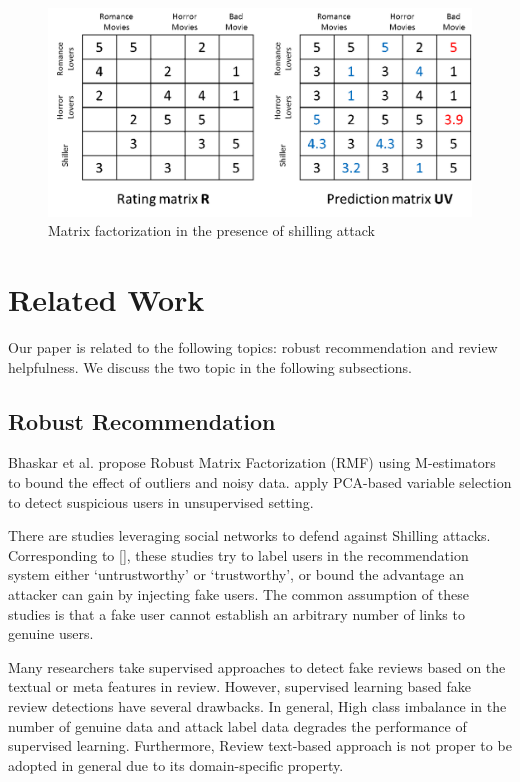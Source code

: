 \documentclass[master,english,final]{kaist-ucs}
\begin{document}
\begin{figure}[h]
    \centerline{\includegraphics[width=12.5cm]{figure/mf_attacked}}
    \caption{  Matrix factorization in the presence of shilling attack   } \label{mf_attacked}
\end{figure}

\chapter{Related Work}
Our paper is related to the following topics: robust recommendation and review helpfulness. We discuss the two topic in the following subsections.

\section{Robust Recommendation}
Bhaskar et al. \cite{RMF} propose Robust Matrix Factorization (RMF) using M-estimators to bound the effect of outliers and noisy data. \cite{LiesAndPropaganda,UnsupervisedShilling,AttackResistant} apply PCA-based variable selection to detect suspicious users in unsupervised setting.


There are studies  leveraging social networks to defend against Shilling attacks.
Corresponding to [], these studies try to label users in the recommendation system either ‘untrustworthy’ or ‘trustworthy’, or bound the advantage an attacker can gain by injecting fake users. The common assumption of these studies is that a fake user cannot establish an arbitrary number of links to genuine users.

Many researchers take supervised approaches to detect fake reviews based on the textual or meta features in review.
However, supervised learning based fake review detections have several drawbacks.
In general, High class imbalance in the number of genuine data and attack label data degrades the performance of supervised learning.
Furthermore, Review text-based approach is not proper to be adopted in general due to its domain-specific property.
\end{document}
